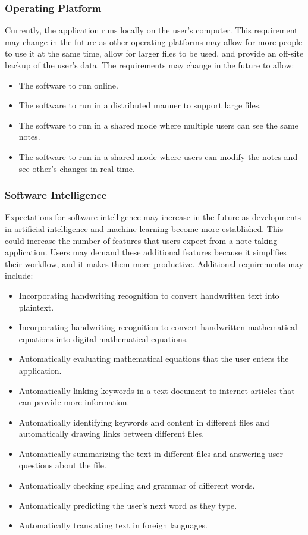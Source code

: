 \documentclass{article}
\begin{document}
\newpage
\subsubsection{Operating Platform}
Currently, the application runs locally on the user's computer. This requirement may change in the future as other operating platforms may allow for more people to use it at the same time, allow for larger files to be used, and provide an off-site backup of the user's data. The requirements may change in the future to allow:

\begin{itemize}
\item The software to run online.
\item The software to run in a distributed manner to support large files.
\item The software to run in a shared mode where multiple users can see the same notes.
\item The software to run in a shared mode where users can modify the notes and see other's changes in real time.
\end{itemize}

\subsubsection{Software Intelligence}
Expectations for software intelligence may increase in the future as developments in artificial intelligence and machine learning become more established. This could increase the number of features that users expect from a note taking application. Users may demand these additional features because it simplifies their workflow, and it makes them more productive. Additional requirements may include:

\begin{itemize}
\item Incorporating handwriting recognition to convert handwritten text into plaintext.
\item Incorporating handwriting recognition to convert handwritten mathematical equations into digital mathematical equations.
\item Automatically evaluating mathematical equations that the user enters the application.
\item Automatically linking keywords in a text document to internet articles that can provide more information.
\item Automatically identifying keywords and content in different files and automatically drawing links between different files.
\item Automatically summarizing the text in different files and answering user questions about the file.
\item Automatically checking spelling and grammar of different words.
\item Automatically predicting the user's next word as they type.
\item Automatically translating text in foreign languages.
\end{itemize}
\end{document}
